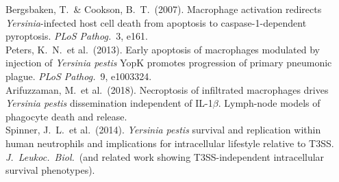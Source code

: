 \documentclass[11pt,a4paper]{article}
\begin{document}
Bergsbaken, T.\ \& Cookson, B.\ T.\ (2007). Macrophage activation redirects \textit{Yersinia}-infected host cell death from apoptosis to caspase-1-dependent pyroptosis. \textit{PLoS Pathog.}\ 3, e161.\\
Peters, K.\ N.\ et al.\ (2013). Early apoptosis of macrophages modulated by injection of \textit{Yersinia pestis} YopK promotes progression of primary pneumonic plague. \textit{PLoS Pathog.}\ 9, e1003324.\\
Arifuzzaman, M.\ et al.\ (2018). Necroptosis of infiltrated macrophages drives \textit{Yersinia pestis} dissemination independent of IL-1$\beta$. Lymph-node models of phagocyte death and release.\\
Spinner, J.\ L.\ et al.\ (2014). \textit{Yersinia pestis} survival and replication within human neutrophils and implications for intracellular lifestyle relative to T3SS. \textit{J.\ Leukoc.\ Biol.}\ (and related work showing T3SS-independent intracellular survival phenotypes).
\end{document}

